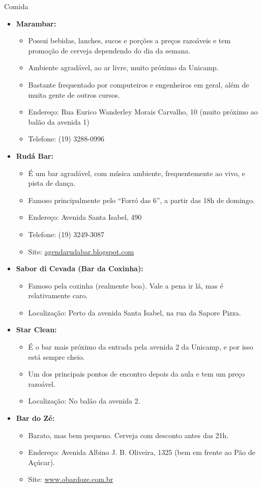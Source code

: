 \begin{story}{Comida}
\begin{itemize}
\item \textbf{Marambar:}
\begin{itemize}
\item Possui bebidas, lanches, sucos e porções a preços razoáveis e tem promoção de cerveja dependendo do dia da semana.
\item Ambiente agradável, ao ar livre, muito próximo da Unicamp.
\item Bastante frequentado por computeiros e engenheiros em geral, além de muita gente de outros cursos.
\item Endereço: Rua Eurico Wanderley Morais Carvalho, 10 (muito próximo ao balão da avenida 1)
\item Telefone: (19) 3288-0996
\end{itemize}

\item \textbf{Rudá Bar:}
\begin{itemize}
\item É um bar agradável, com música ambiente, frequentemente ao vivo, e pista de dança.
\item Famoso principalmente pelo ``Forró das 6'', a partir das 18h de domingo.
\item Endereço: Avenida Santa Isabel, 490
\item Telefone: (19) 3249-3087
\item Site: \url{agendarudabar.blogspot.com}
\end{itemize}

\item \textbf{Sabor di Cevada (Bar da Coxinha):}
\begin{itemize}
\item Famoso pela coxinha (realmente boa). Vale a pena ir lá, mas é relativamente caro.
\item Localização: Perto da avenida Santa Isabel, na rua da Sapore Pizza.
\end{itemize}

\item \textbf{Star Clean:}
\begin{itemize}
\item É o bar mais próximo da entrada pela avenida 2 da Unicamp, e por isso está sempre cheio.
\item Um dos principais pontos de encontro depois da aula e tem um preço razoável.
\item Localização: No balão da avenida 2.
\end{itemize}


\item \textbf{Bar do Zé:}
\begin{itemize}
\item Barato, mas bem pequeno. Cerveja com desconto antes das 21h.
\item Endereço: Avenida Albino J. B. Oliveira, 1325 (bem em frente ao Pão de Açúcar).
\item Site: \url{www.obardoze.com.br}
\end{itemize}

\end{itemize}

\end{story}